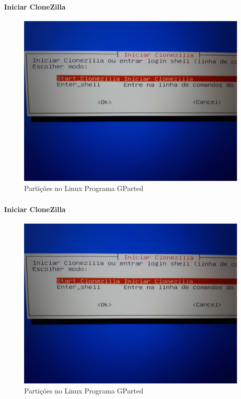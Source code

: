 \documentclass{beamer}
\begin{document}
\begin{frame}[plain,c]
   \frametitle{\insertsection}
    \framesubtitle{Iniciar CloneZilla}
    \begin{figure}[!h]
        
        \includegraphics[width=1\linewidth]{images/backup/bkp5.jpg}
        \caption{Partições no Linux Programa GParted}
    \end{figure}
\end{frame}

\begin{frame}[plain,c]
   \frametitle{\insertsection}
    \framesubtitle{Iniciar CloneZilla}
    \begin{figure}[!h]
        
        \includegraphics[width=1\linewidth]{images/backup/bkp5.jpg}
        \caption{Partições no Linux Programa GParted}
    \end{figure}
\end{frame}
\end{document}
